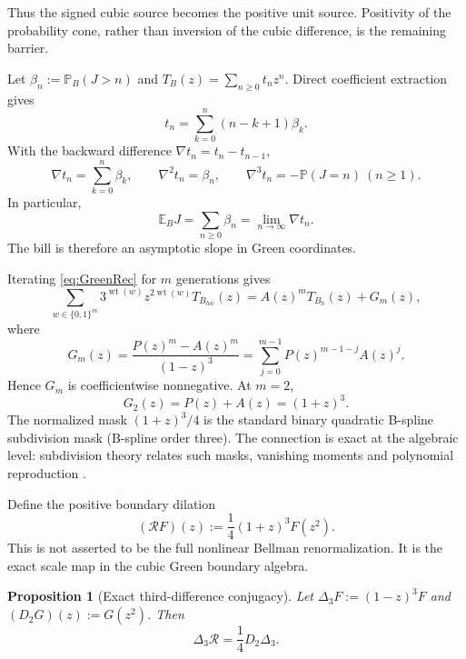 \documentclass[11pt,a4paper]{article}
\newtheorem{proposition}[theorem]{Proposition}
\theoremstyle{definition}
\theoremstyle{remark}
\newcommand{\E}{\mathbb E}
\newcommand{\Pp}{\mathbb P}
\newcommand{\cR}{\mathcal R}
\newcommand{\bits}{\{0,1\}}
\newcommand{\wt}{\operatorname{wt}}
\begin{document}
Thus the signed cubic source becomes the positive unit source.  Positivity of
the probability cone, rather than inversion of the cubic difference, is the
remaining barrier.

Let \(\beta_n:=\Pp_B(J>n)\) and
\(T_B(z)=\sum_{n\ge0}t_nz^n\).  Direct coefficient extraction gives
\begin{equation}
 t_n=\sum_{k=0}^n(n-k+1)\beta_k.
 \label{eq:tcoeff}
\end{equation}
With the backward difference \(\nabla t_n=t_n-t_{n-1}\),
\begin{equation}
 \boxed{
 \nabla t_n=\sum_{k=0}^n\beta_k,
 \qquad
 \nabla^2t_n=\beta_n,
 \qquad
 \nabla^3t_n=-\Pp(J=n)\ (n\ge1).
 }
 \label{eq:curvature}
\end{equation}
In particular,
\begin{equation}
 \boxed{
 \E_BJ=\sum_{n\ge0}\beta_n
 =\lim_{n\to\infty}\nabla t_n.
 }
 \label{eq:meanSlope}
\end{equation}
The bill is therefore an asymptotic slope in Green coordinates.

Iterating \eqref{eq:GreenRec} for \(m\) generations gives
\begin{equation}
 \sum_{w\in\bits^m}3^{\wt(w)}z^{2\wt(w)}T_{B_{hw}}(z)
 =A(z)^mT_{B_h}(z)+G_m(z),
 \label{eq:blockGreen}
\end{equation}
where
\begin{equation}
 \boxed{
 G_m(z)=\frac{P(z)^m-A(z)^m}{(1-z)^3}
 =\sum_{j=0}^{m-1}P(z)^{m-1-j}A(z)^j.
 }
 \label{eq:Gm}
\end{equation}
Hence \(G_m\) is coefficientwise nonnegative.  At \(m=2\),
\begin{equation}
 \boxed{G_2(z)=P(z)+A(z)=(1+z)^3.}
 \label{eq:G2}
\end{equation}
The normalized mask \((1+z)^3/4\) is the standard binary quadratic B-spline
subdivision mask (B-spline order three).  The connection is exact at the
algebraic level: subdivision theory relates such masks, vanishing moments and
polynomial reproduction \cite{CharinaConti2013}.

Define the positive boundary dilation
\begin{equation}
 \boxed{
 (\cR F)(z):=\frac14(1+z)^3F(z^2).
 }
 \label{eq:Rboundary}
\end{equation}
This is not asserted to be the full nonlinear Bellman renormalization.  It is
the exact scale map in the cubic Green boundary algebra.

\begin{proposition}[Exact third-difference conjugacy]
Let \(\Delta_3F:=(1-z)^3F\) and \((D_2G)(z):=G(z^2)\).  Then
\begin{equation}
 \boxed{
 \Delta_3\cR=\frac14D_2\Delta_3.
 }
 \label{eq:diffconj}
\end{equation}
\end{proposition}
\end{document}
